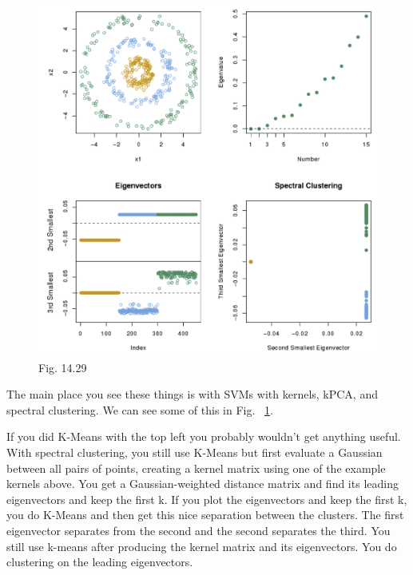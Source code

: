 \documentclass[a4paper]{article}
\begin{document}
\begin{figure}
\centering
\includegraphics[width=1.0\textwidth]{fig14_29.png}
\caption{\label{fig:kernel}Fig. 14.29}
\end{figure}

The main place you see these things is with SVMs with kernels, kPCA, and spectral clustering.  We can see some of this in Fig. ~\ref{fig:kernel}.  

If you did K-Means with the top left you probably wouldn't get anything useful.  With spectral clustering, you still use K-Means but first evaluate a Gaussian between all pairs of points, creating a kernel matrix using one of the example kernels above.  You get a Gaussian-weighted distance matrix and find its leading eigenvectors and keep the first k.  If you plot the eigenvectors and keep the first k, you do K-Means and then get this nice separation between the clusters.  The first eigenvector separates from the second and the second separates the third.  You still use k-means after producing the kernel matrix and its eigenvectors.  You do clustering on the leading eigenvectors.
\end{document}
